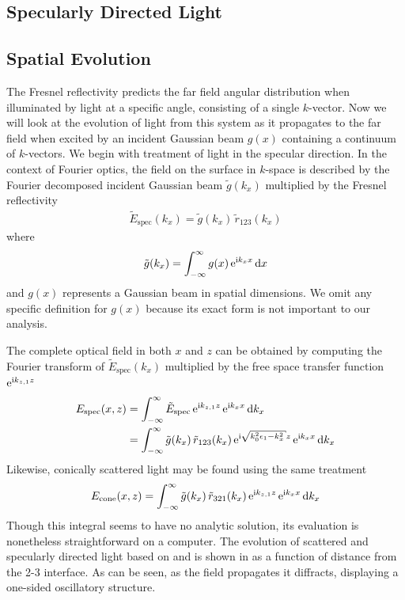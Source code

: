 \documentclass[a4paper,titlepage,onecolumn]{report}
\begin{document}
\subsection{Specularly Directed Light}


\subsection{Spatial Evolution}
The Fresnel reflectivity predicts the far field angular distribution when
illuminated by light at a specific angle, consisting of a single
$k$-vector.  Now we will look at the evolution of light from this system
as it propagates to the far field when excited by an incident Gaussian beam
$g(x)$ containing a continuum of $k$-vectors.  We begin with treatment of
light in the specular direction.  In the context of Fourier
optics, the field on the surface in $k$-space is described by the Fourier
decomposed incident Gaussian beam $\tilde{g}(k_x)$ multiplied by the
Fresnel reflectivity
\begin{align}
\tilde{E}_\text{spec}(k_x)=\tilde{g}(k_x)\,\tilde{r}_\text{123}(k_x)
\end{align}
where
\begin{align}
\tilde{g}(k_x) = \int_{-\infty}^{\infty} g(x)\, {\mathrm{e}}^{{\mathrm{i}} k_x x} \,\mathrm{d} x
\end{align}
and $g(x)$ represents a Gaussian beam in spatial dimensions.  We omit any 
specific definition for $g(x)$ because its exact form
is not important to our analysis.

The complete optical field in both $x$ and $z$ can be obtained by computing
the Fourier transform of $\tilde{E}_\text{spec}(k_x)$ multiplied 
by the free space transfer function ${\mathrm{e}}^{{\mathrm{i}} k_{z,1} z}$
\begin{align}
E_\text{spec}(x,z) &= \intinfty \tilde{E}_\text{spec}\, \me^{\mi k_{z,1} z}\, \me^{\mi k_x x} \md k_x\\
 &= \intinfty \tilde{g}(k_x)\, \tilde{r}_{123}(k_x)\, \me^{\mi \sqrt{k_0^2 \epsilon_1 - k_x^2}z}\, \me^{\mi k_x x} \md k_x
\label{eqn:fourier123}
\end{align}
Likewise, conically scattered light may be found using the same treatment
\begin{align}
E_\text{cone}(x,z) = \int_{-\infty}^{\infty} \tilde{g}(k_x)\, \tilde{r}_{321}(k_x)\,{\mathrm{e}}^{{\mathrm{i}} k_{z,1} z}\, {\mathrm{e}}^{{\mathrm{i}} k_x x} \,\mathrm{d} k_x
\label{eqn:fourier321}
\end{align}
Though this integral seems to have no analytic solution, its evaluation is
nonetheless straightforward on a computer.
The evolution of scattered and specularly directed light based on
 and  is shown in
 as a function of distance from the 2-3
interface.  As can be seen, as the field propagates it diffracts,
displaying a one-sided oscillatory structure. 
\end{document}
